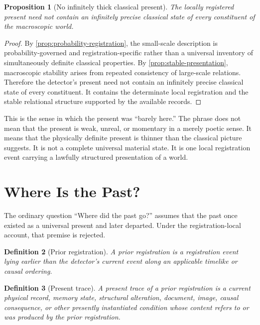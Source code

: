 \documentclass[12pt,onecolumn]{article}
\newtheorem{proposition}{Proposition}[section]
\newtheorem{definition}[proposition]{Definition}
\begin{document}
\begin{proposition}[No infinitely thick classical present]
\label{prop:no-thick-present}
The locally registered present need not contain an infinitely precise classical state of every constituent of the macroscopic world.
\end{proposition}

\begin{proof}
By \cref{prop:probability-registration}, the small-scale description is probability-governed and registration-specific rather than a universal inventory of simultaneously definite classical properties. By \cref{prop:stable-presentation}, macroscopic stability arises from repeated consistency of large-scale relations. Therefore the detector's present need not contain an infinitely precise classical state of every constituent. It contains the determinate local registration and the stable relational structure supported by the available records.
\end{proof}

This is the sense in which the present was ``barely here.'' The phrase does not mean that the present is weak, unreal, or momentary in a merely poetic sense. It means that the physically definite present is thinner than the classical picture suggests. It is not a complete universal material state. It is one local registration event carrying a lawfully structured presentation of a world.

\section{Where Is the Past?}

The ordinary question ``Where did the past go?'' assumes that the past once existed as a universal present and later departed. Under the registration-local account, that premise is rejected.

\begin{definition}[Prior registration]
\label{def:prior-registration}
A prior registration is a registration event lying earlier than the detector's current event along an applicable timelike or causal ordering.
\end{definition}

\begin{definition}[Present trace]
\label{def:present-trace}
A present trace of a prior registration is a current physical record, memory state, structural alteration, document, image, causal consequence, or other presently instantiated condition whose content refers to or was produced by the prior registration.
\end{definition}
\end{document}
